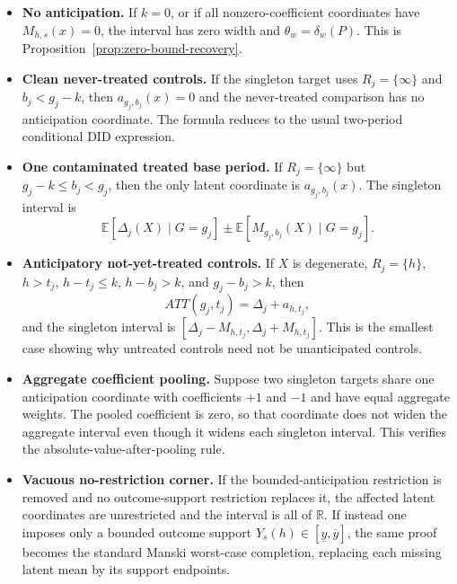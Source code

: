 \documentclass[11pt]{article}
\newcommand{\E}{\mathbb{E}}
\theoremstyle{definition}
\theoremstyle{plain}
\theoremstyle{remark}
\begin{document}
\begin{itemize}[leftmargin=*]
  \item \textbf{No anticipation.}  If \(k=0\), or if all nonzero-coefficient
  coordinates have \(M_{h,s}(x)=0\), the interval has zero width and
  \(\theta_w=\delta_w(P)\).  This is Proposition~\ref{prop:zero-bound-recovery}.

  \item \textbf{Clean never-treated controls.}  If the singleton target uses
  \(R_j=\{\infty\}\) and \(b_j<g_j-k\), then \(a_{g_j,b_j}(x)=0\) and the
  never-treated comparison has no anticipation coordinate.  The formula reduces
  to the usual two-period conditional DID expression.

  \item \textbf{One contaminated treated base period.}  If \(R_j=\{\infty\}\) but
  \(g_j-k\le b_j<g_j\), then the only latent coordinate is \(a_{g_j,b_j}(x)\).
  The singleton interval is
  \[
    \E[\Delta_j(X)\mid G=g_j]
    \pm
    \E[M_{g_j,b_j}(X)\mid G=g_j].
  \]

  \item \textbf{Anticipatory not-yet-treated controls.}  If \(X\) is degenerate,
  \(R_j=\{h\}\), \(h>t_j\), \(h-t_j\le k\), \(h-b_j>k\), and \(g_j-b_j>k\), then
  \[
    ATT(g_j,t_j)=\Delta_j+a_{h,t_j},
  \]
  and the singleton interval is \([\Delta_j-M_{h,t_j},\Delta_j+M_{h,t_j}]\).
  This is the smallest case showing why untreated controls need not be
  unanticipated controls.

  \item \textbf{Aggregate coefficient pooling.}  Suppose two singleton targets
  share one anticipation coordinate with coefficients \(+1\) and \(-1\) and have
  equal aggregate weights.  The pooled coefficient is zero, so that coordinate
  does not widen the aggregate interval even though it widens each singleton
  interval.  This verifies the absolute-value-after-pooling rule.

  \item \textbf{Vacuous no-restriction corner.}  If the bounded-anticipation
  restriction is removed and no outcome-support restriction replaces it, the
  affected latent coordinates are unrestricted and the interval is all of
  \(\mathbb{R}\).  If instead one imposes only a bounded outcome support
  \(Y_s(h)\in[\underline y,\overline y]\), the same proof becomes the standard
  Manski worst-case completion, replacing each missing latent mean by its support
  endpoints.
\end{itemize}
\end{document}
